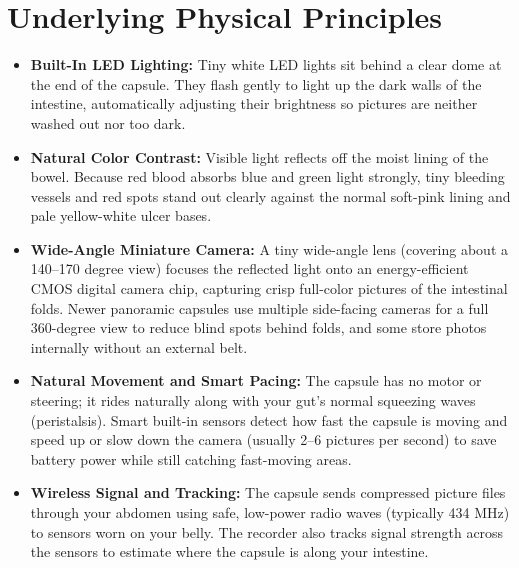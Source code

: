 \section{Underlying Physical Principles}
\begin{itemize}
    \item \textbf{Built-In LED Lighting:} Tiny white LED lights sit behind a clear dome at the end of the capsule. They flash gently to light up the dark walls of the intestine, automatically adjusting their brightness so pictures are neither washed out nor too dark.
    \item \textbf{Natural Color Contrast:} Visible light reflects off the moist lining of the bowel. Because red blood absorbs blue and green light strongly, tiny bleeding vessels and red spots stand out clearly against the normal soft-pink lining and pale yellow-white ulcer bases.
    \item \textbf{Wide-Angle Miniature Camera:} A tiny wide-angle lens (covering about a 140--170 degree view) focuses the reflected light onto an energy-efficient CMOS digital camera chip, capturing crisp full-color pictures of the intestinal folds. Newer panoramic capsules use multiple side-facing cameras for a full 360-degree view to reduce blind spots behind folds, and some store photos internally without an external belt.
    \item \textbf{Natural Movement and Smart Pacing:} The capsule has no motor or steering; it rides naturally along with your gut's normal squeezing waves (peristalsis). Smart built-in sensors detect how fast the capsule is moving and speed up or slow down the camera (usually 2--6 pictures per second) to save battery power while still catching fast-moving areas.
    \item \textbf{Wireless Signal and Tracking:} The capsule sends compressed picture files through your abdomen using safe, low-power radio waves (typically 434 MHz) to sensors worn on your belly. The recorder also tracks signal strength across the sensors to estimate where the capsule is along your intestine.
\end{itemize}

